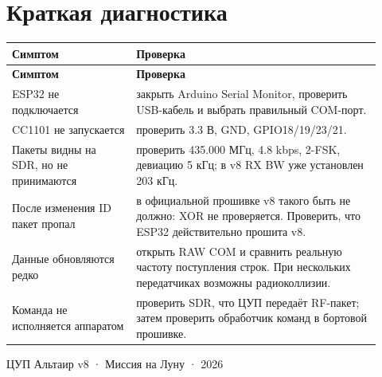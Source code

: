 \documentclass[11pt,a4paper]{article}
\begin{document}
\section{Краткая диагностика}

\begin{longtable}{p{0.31\linewidth}p{0.61\linewidth}}
\toprule
\textbf{Симптом} & \textbf{Проверка}\\
\midrule
\endfirsthead
\toprule
\textbf{Симптом} & \textbf{Проверка}\\
\midrule
\endhead
ESP32 не подключается & закрыть Arduino Serial Monitor, проверить USB-кабель и выбрать правильный COM-порт.\\
CC1101 не запускается & проверить 3.3 В, GND, GPIO18/19/23/21.\\
Пакеты видны на SDR, но не принимаются & проверить 435.000 МГц, 4.8 kbps, 2-FSK, девиацию 5 кГц; в v8 RX BW уже установлен 203 кГц.\\
После изменения ID пакет пропал & в официальной прошивке v8 такого быть не должно: XOR не проверяется. Проверить, что ESP32 действительно прошита v8.\\
Данные обновляются редко & открыть RAW COM и сравнить реальную частоту поступления строк. При нескольких передатчиках возможны радиоколлизии.\\
Команда не исполняется аппаратом & проверить SDR, что ЦУП передаёт RF-пакет; затем проверить обработчик команд в бортовой прошивке.\\
\bottomrule
\end{longtable}

\vfill
\begin{center}
\small ЦУП Альтаир v8 · Миссия на Луну · 2026
\end{center}
\end{document}
